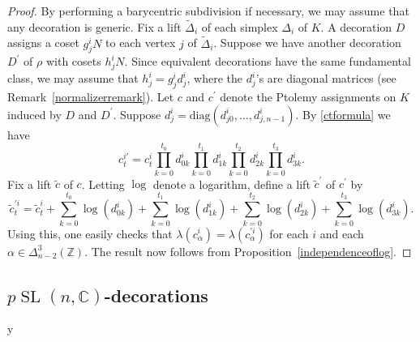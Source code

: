 \documentclass[11pt]{amsart}
\theoremstyle{definition}
\numberwithin{equation}{section}
\def\printname#1{
        \if\draft y
                \smash{\makebox[0pt]{\hspace{-0.5in}
                        \raisebox{8pt}{\tt\tiny #1}}}
        \fi
}
\def\lbl#1{\label{#1}\printname{#1}}
\DeclareMathOperator{\SL}{SL}
\DeclareMathOperator{\diag}{diag}
\newcommand{\C}{\mathbb C}
\newcommand{\Z}{\mathbb Z}
\def\diag{\mathrm{diag}}
\begin{document}
\begin{proof}
By performing a barycentric subdivision if necessary, we may assume that any 
decoration is generic.
Fix a lift $\widetilde\Delta_i$ of each simplex $\Delta_i$ of $K$. A 
decoration $D$ assigns a coset $g_j^iN$ to each vertex $j$ of 
$\widetilde\Delta_i$. Suppose we have another decoration $D^\prime$ of $\rho$ 
with cosets $h_j^iN$. Since equivalent decorations have the same fundamental 
class, we may assume that $h_j^i=g_j^id_j^i$, where the $d_j^i$'s are diagonal 
matrices (see Remark~\ref{normalizerremark}). Let $c$ and $c^\prime$ denote the 
Ptolemy assignments on $K$ induced by $D$ and $D^\prime$. Suppose 
$d^i_j=\diag(d^i_{j0},\dots,d^i_{j,n-1})$. By \eqref{ctformula} we have 
\begin{equation}
c^{i\prime}_t=c^i_t\prod_{k=0}^{t_0}d^i_{0k}\prod_{k=0}^{t_1}d^i_{1k}
\prod_{k=0}^{t_2}d^i_{2k}\prod_{k=0}^{t_3}d^i_{3k}.
\end{equation}
Fix a lift $\widetilde c$ of $c$. Letting $\log$ denote a logarithm, 
define a lift $\widetilde c^\prime$ of $c^\prime$ by
\begin{equation}
\widetilde c^{\prime i}_t=\widetilde c^i_t+\sum_{k=0}^{t_0}\log(d^i_{0k})
+\sum_{k=0}^{t_1}\log(d^i_{1k})+\sum_{k=0}^{t_2}\log(d^i_{2k})+\sum_{k=0}^{t_3}\log(d^i_{3k}).
\end{equation}
Using this, one easily checks that $\lambda(c^i_\alpha)
=\lambda(c^{\prime i}_\alpha)$ for each $i$ and each $\alpha\in \Delta^3_{n-2}(\Z)$.
The result now follows from Proposition~\ref{independenceoflog}.
\end{proof}


\subsection{$p\SL(n,\C)$-decorations}
\lbl{sub.pSLdecorations}
\end{document}
